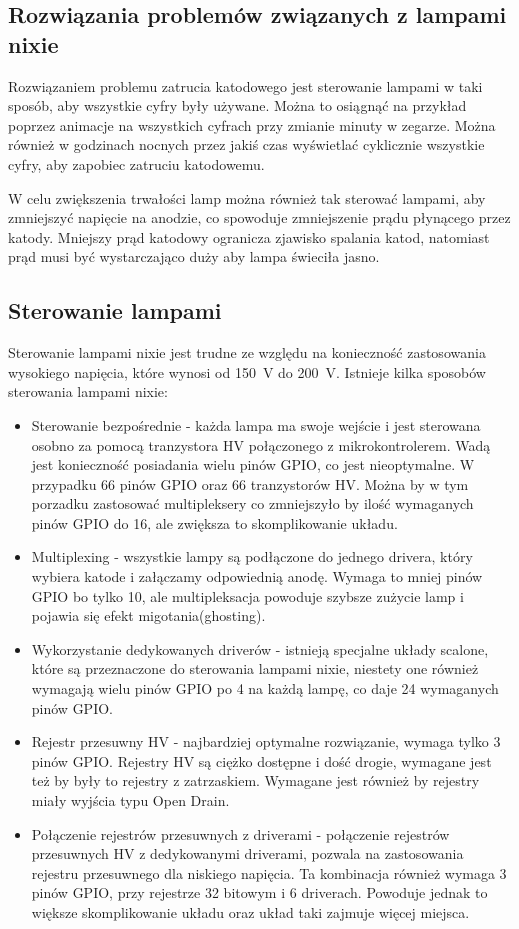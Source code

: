 \documentclass[../main.tex]{subfiles}
\begin{document}
\subsection{Rozwiązania problemów związanych z lampami nixie}
Rozwiązaniem problemu zatrucia katodowego jest sterowanie lampami w taki sposób, aby wszystkie cyfry były używane.
Można to osiągnąć na przykład poprzez animacje na wszystkich cyfrach przy zmianie minuty w zegarze.
Można również w godzinach nocnych przez jakiś czas wyświetlać cyklicznie wszystkie cyfry, aby zapobiec zatruciu katodowemu.

W celu zwiększenia trwałości lamp można również tak sterować lampami, aby zmniejszyć napięcie na anodzie, co spowoduje zmniejszenie prądu płynącego przez katody.
Mniejszy prąd katodowy ogranicza zjawisko spalania katod, natomiast prąd musi być wystarczająco duży aby lampa świeciła jasno.

\newpage

\subsection{Sterowanie lampami}
Sterowanie lampami nixie jest trudne ze względu na konieczność zastosowania wysokiego napięcia, które wynosi od \SI{150}{\volt} do \SI{200}{\volt}.
Istnieje kilka sposobów sterowania lampami nixie:

\begin{itemize}
    \item Sterowanie bezpośrednie - każda lampa ma swoje wejście i jest sterowana osobno za pomocą tranzystora HV połączonego z mikrokontrolerem.
    Wadą jest konieczność posiadania wielu pinów GPIO, co jest nieoptymalne. W przypadku 66 pinów GPIO oraz 66 tranzystorów HV.
    Można by w tym porzadku zastosować multipleksery co zmniejszyło by ilość wymaganych pinów GPIO do 16, ale zwiększa to skomplikowanie układu.
    \item Multiplexing - wszystkie lampy są podłączone do jednego drivera, który wybiera katode i załączamy odpowiednią anodę. 
    Wymaga to mniej pinów GPIO bo tylko 10, ale multipleksacja powoduje szybsze zużycie lamp i pojawia się efekt migotania(ghosting).
    \item Wykorzystanie dedykowanych driverów - istnieją specjalne układy scalone, które są przeznaczone do sterowania lampami nixie, niestety
    one również wymagają wielu pinów GPIO po 4 na każdą lampę, co daje 24 wymaganych pinów GPIO.
    \item Rejestr przesuwny HV - najbardziej optymalne rozwiązanie, wymaga tylko 3 pinów GPIO. Rejestry HV są ciężko dostępne i dość drogie,
    wymagane jest też by były to rejestry z zatrzaskiem. Wymagane jest również by rejestry miały wyjścia typu Open Drain.
    \item Połączenie rejestrów przesuwnych z driverami - połączenie rejestrów przesuwnych HV z dedykowanymi driverami, pozwala na zastosowania
    rejestru przesuwnego dla niskiego napięcia. Ta kombinacja również wymaga 3 pinów GPIO, przy rejestrze 32 bitowym i 6 driverach. Powoduje jednak to
    większe skomplikowanie układu oraz układ taki zajmuje więcej miejsca.
\end{itemize}
\end{document}
